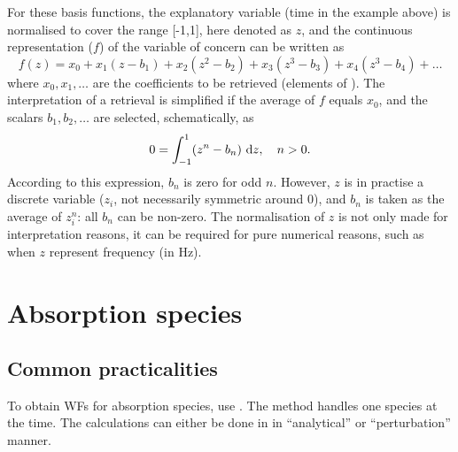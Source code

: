 For these basis functions, the explanatory variable (time in the example above)
is normalised to cover the range [-1,1], here denoted as $z$, and the
continuous representation ($f$) of the variable of concern can be written as
\begin{equation}
  f(z) = x_0 + x_1(z-b_1) + x_2(z^2-b_2) + x_3(z^3-b_3) + x_4(z^3-b_4) + \dots  
\end{equation}
where $x_0, x_1, \dots$ are the coefficients to be retrieved (elements of
\SttVct). The interpretation of a retrieval is simplified if the average of $f$
equals $x_0$, and the scalars $b_1, b_2, \dots$ are selected, schematically, as
\begin{equation}
  0 = \int_{-1}^1 \!\left(z^n-b_n\right) \, \mathrm{d} z, \quad n>0.
\end{equation}
According to this expression, $b_n$ is zero for odd $n$. However, $z$ is in
practise a discrete variable ($z_i$, not necessarily symmetric around 0), and
$b_n$ is taken as the average of $z_i^n$: all $b_n$ can be non-zero. The
normalisation of $z$ is not only made for interpretation reasons, it can be
required for pure numerical reasons, such as when $z$ represent frequency (in
Hz).




\section{Absorption species}
\label{sec:wfuns:absspecies}

\subsection{Common practicalities}
%
To obtain WFs for absorption species, use . The
method handles one species at the time. The calculations can either be done in
in ``analytical'' or ``perturbation'' manner.

